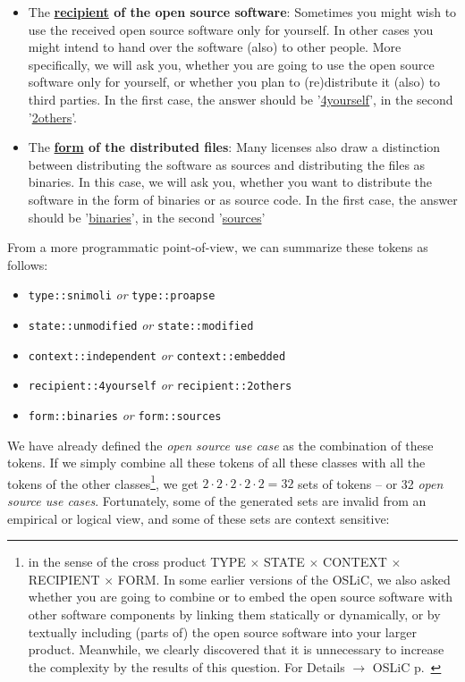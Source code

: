 \begin{itemize}
  \item The \textbf{\underline{recipient} of the open source software}:
  Sometimes you might wish to use the received open source software only for
  yourself. In other cases you might intend to hand over the software (also) to
  other people. More specifically, we will ask you, whether you are going to use
  the open source software only for yourself, or whether you plan to
  (re)distribute it (also) to third parties. In the first case, the answer
  should be '\underline{4yourself}', in the second '\underline{2others}'.
 
  \item The \textbf{\underline{form} of the distributed files}: Many licenses
  also draw a distinction between distributing the software as sources and
  distributing the files as binaries. In this case, we will ask you, whether you
  want to distribute the software in the form of binaries or as source code. In
  the first case, the answer should be '\underline{binaries}', in the second
  '\underline{sources}'
  
\end{itemize}

From a more programmatic point-of-view, we can summarize these tokens as
follows:

\begin{itemize}
  \item \texttt{type::snimoli} \emph{or} \texttt{type::proapse}
  \item \texttt{state::unmodified} \emph{or} \texttt{state::modified}
  \item \texttt{context::independent} \emph{or} \texttt{context::embedded}
  \item \texttt{recipient::4yourself} \emph{or} \texttt{recipient::2others}
  \item \texttt{form::binaries} \emph{or} \texttt{form::sources}
\end{itemize}

We have already defined the \emph{open source use case} as the combination of
these tokens. If we simply combine all these tokens of all these classes with
all the tokens of the other classes\footnote{in the sense of the cross product
TYPE $\times$ STATE $\times$ CONTEXT $\times$ RECIPIENT $\times$ FORM. In some
earlier versions of the OSLiC, we also asked whether you are going to combine or
to embed the open source software with other software components by linking them
statically or dynamically, or by textually including (parts of) the open source
software into your larger product. Meanwhile, we clearly discovered that it is
unnecessary to increase the complexity by the results of this question. For
Details $\rightarrow$ OSLiC p.\ \pageref{sec:LinkingSecondary}}, we get
$2 \cdot 2 \cdot 2 \cdot 2 \cdot 2 = 32$ sets of tokens -- or 32 \emph{open source use cases}.
Fortunately, some of the generated sets are invalid from an empirical or logical
view, and some of these sets are context sensitive:

